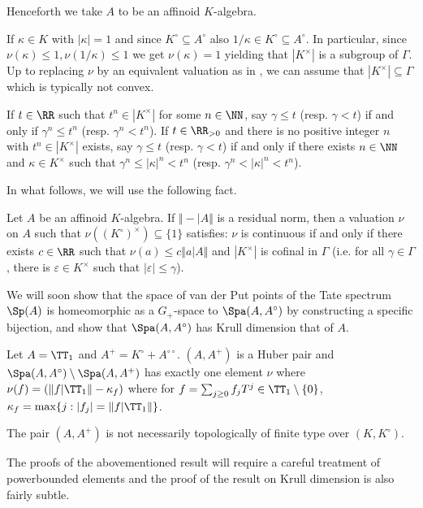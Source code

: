 Henceforth we take $A$ to be an affinoid $K$-algebra. 
\begin{example}
    If $\kappa\in K$ with $|\kappa|=1$ and since $K^{\circ}\subseteq A^{\circ}$ also $1/\kappa\in K^{\circ}\subseteq A^{\circ}$.
In particular, since $\nu(\kappa)\leq 1,\nu(1/\kappa)\leq 1$ we get $\nu(\kappa)=1$ yielding that $|K^{\times}|$ is a subgroup of $\Gamma$. 
Up to replacing $\nu$ by an equivalent valuation as in , we can assume that $|K^{\times}|\subseteq\Gamma$ which is typically not convex. 
\end{example}
\begin{definition}
If $t\in\RR$ such that $t^{n}\in|K^{\times}|$ for some $n\in\NN$, say $\gamma\leq t$ (resp. $\gamma<t$) if and only if $\gamma^{n}\leq t^{n}$ (resp. $\gamma^{n}<t^{n}$). If $t\in\RR_{>0}$ and there is no positive integer $n$ with $t^{n}\in |K^{\times}|$ exists, say $\gamma\leq t$ (resp. $\gamma<t$) 
if and only if there exists $n\in\NN$ and $\kappa\in K^{\times}$ such that $\gamma^{n}\leq|\kappa|^{n}<t^n$ (resp. $\gamma^{n} <|\kappa|^{n}<t^n$). 
\end{definition}
In what follows, we will use the following fact. 
\begin{lemma}
    Let $A$ be an affinoid $K$-algebra. If $\Vert-|A\Vert$ is a residual norm, then a valuation $\nu$ on $A$ such that $\nu((K^{\circ})^{\times})\subseteq\{1\}$ satisfies: $\nu$ is continuous if and only if there exists $c\in\RR$ such that $\nu(a)\leq c\Vert a|A\Vert$ and $|K^{\times}|$ is cofinal in $\Gamma$ (i.e. for all $\gamma\in\Gamma$, there is $\varepsilon\in K^{\times}$ such that $|\varepsilon|\leq\gamma$). 
\end{lemma}
We will soon show that the space of van der Put points of the Tate spectrum
$\Sp(A)$ is homeomorphic as a $G_{+}$-space to $\Spa(A,A^{\circ})$ by constructing a specific bijection, and show that $\Spa(A,A^{\circ})$ has Krull dimension that of $A$. 
\begin{example}
    Let $A=\TT_{1}$ and $A^{+}=K^{\circ}+A^{\circ\circ}$. $(A,A^{+})$ is a Huber pair and $\Spa(A,A^{\circ})\setminus\Spa(A,A^{+})$ has exactly one element $\nu$ where $\nu(f)=(\Vert f|\TT_{1}\Vert -\kappa_{f})$ where for $f=\sum_{j\geq0}f_{j}T^{j}\in\TT_{1}\setminus\{0\}$, $\kappa_{f}=\max\{j:|f_{j}|=\Vert f|\TT_{1}\Vert\}$. 
\end{example}
\begin{remark}
    The pair $(A,A^{+})$ is not necessarily topologically of finite type over $(K,K^{\circ})$. 
\end{remark}
The proofs of the abovementioned result will require a careful treatment of powerbounded elements and the proof of the result on Krull dimension is also fairly subtle. 
